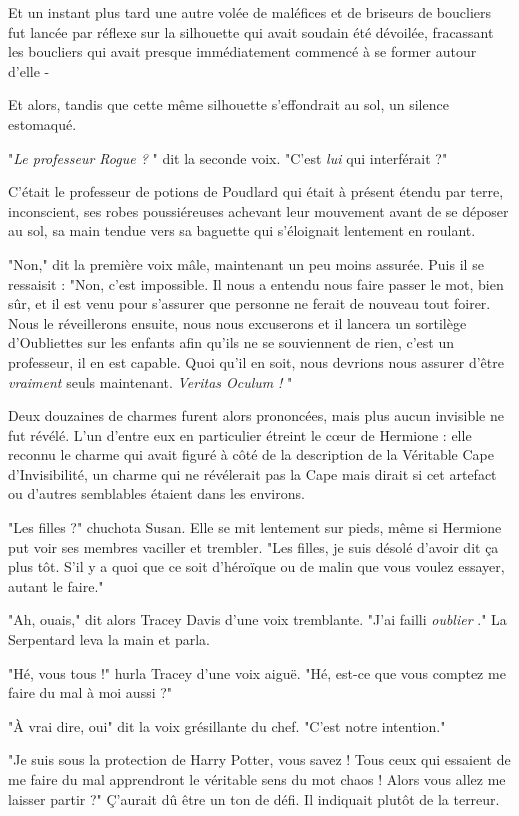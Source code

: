Et un instant plus tard une autre volée de maléfices et de briseurs de boucliers fut lancée par réflexe sur la silhouette qui avait soudain été dévoilée, fracassant les boucliers qui avait presque immédiatement commencé à se former autour d'elle -

Et alors, tandis que cette même silhouette s'effondrait au sol, un silence estomaqué.

"\emph{Le professeur Rogue ?} " dit la seconde voix. "C'est \emph{lui}  qui interférait ?"

C'était le professeur de potions de Poudlard qui était à présent étendu par terre, inconscient, ses robes poussiéreuses achevant leur mouvement avant de se déposer au sol, sa main tendue vers sa baguette qui s'éloignait lentement en roulant.

"Non," dit la première voix mâle, maintenant un peu moins assurée. Puis il se ressaisit : "Non, c'est impossible. Il nous a entendu nous faire passer le mot, bien sûr, et il est venu pour s'assurer que personne ne ferait de nouveau tout foirer. Nous le réveillerons ensuite, nous nous excuserons et il lancera un sortilège d'Oubliettes sur les enfants afin qu'ils ne se souviennent de rien, c'est un professeur, il en est capable. Quoi qu'il en soit, nous devrions nous assurer d'être \emph{vraiment}  seuls maintenant. \emph{Veritas Oculum}  \emph{!} "

Deux douzaines de charmes furent alors prononcées, mais plus aucun invisible ne fut révélé. L'un d'entre eux en particulier étreint le cœur de Hermione : elle reconnu le charme qui avait figuré à côté de la description de la Véritable Cape d'Invisibilité, un charme qui ne révélerait pas la Cape mais dirait si cet artefact ou d'autres semblables étaient dans les environs.

"Les filles ?" chuchota Susan. Elle se mit lentement sur pieds, même si Hermione put voir ses membres vaciller et trembler. "Les filles, je suis désolé d'avoir dit ça plus tôt. S'il y a quoi que ce soit d'héroïque ou de malin que vous voulez essayer, autant le faire."

"Ah, ouais," dit alors Tracey Davis d'une voix tremblante. "J'ai failli \emph{oublier} ." La Serpentard leva la main et parla.

"Hé, vous tous !" hurla Tracey d'une voix aiguë. "Hé, est-ce que vous comptez me faire du mal à moi aussi ?"

"À vrai dire, oui" dit la voix grésillante du chef. "C'est notre intention."

"Je suis sous la protection de Harry Potter, vous savez ! Tous ceux qui essaient de me faire du mal apprendront le véritable sens du mot chaos ! Alors vous allez me laisser partir ?" Ç'aurait dû être un ton de défi. Il indiquait plutôt de la terreur.

